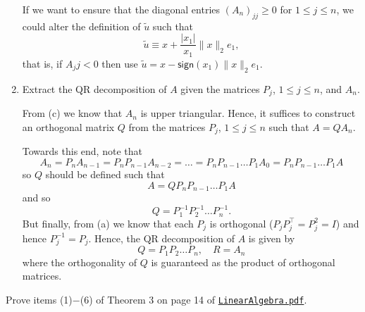 \documentclass{../../../kin_math}
\begin{document}
\begin{questions}
\begin{enumerate}
\begin{solution}
      If we want to ensure that the diagonal entries $(A_n)_{jj} \geq 0$ for $1 \leq j \leq n$, we could alter the definition of $\tilde{u}$ such that
      \begin{equation*}
        \tilde{u} \equiv x + \frac{|x_1|}{x_1} \lVert x \rVert_2 e_1,
      \end{equation*}
      that is, if $A_jj < 0$ then use $\tilde{u}  = x - \textsf{sign}(x_1) \lVert x \rVert_2 e_1$.
    \end{solution}
    \item Extract the QR decomposition of $A$ given the matrices $P_j$, $1 \leq j \leq n$, and $A_n$.
    \begin{solution}
      From (c) we know that $A_n$ is upper triangular. Hence, it suffices to construct an orthogonal matrix $Q$ from the matrices $P_j$, $1 \leq j \leq n$ such that $A = QA_n$.

      Towards this end, note that
      \begin{equation*}
        A_n = P_n A_{n - 1} = P_n P_{n - 1} A_{n - 2} = \dots = P_n P_{n - 1} \dots P_1 A_0 = P_n P_{n - 1} \dots P_1 A
      \end{equation*}
      so $Q$ should be defined such that
      \begin{equation*}
        A = Q P_n P_{n - 1} \dots P_1 A
      \end{equation*}
      and so
      \begin{equation*}
        Q = P_1^{-1} P_2^{-1} \dots P_n^{-1}.
      \end{equation*}
      But finally, from (a) we know that each $P_j$ is orthogonal ($P_jP_j^\top = P_j^2 = I$) and hence $P_j^{-1} = P_j$. Hence, the QR decomposition of $A$ is given by
      \begin{equation*}
        Q = P_1 P_2 \dots P_n, \quad R = A_n
      \end{equation*}
      where the orthogonality of $Q$ is guaranteed as the product of orthogonal matrices.
    \end{solution}
  \end{enumerate}

  \question Prove items (1)$-$(6) of Theorem 3 on page 14 of \texttt{\href{https://www.math.umd.edu/~mariakc/AMSC660/LectureNotes/LinearAlgebra.pdf}{LinearAlgebra.pdf}}.
  \begin{solution}


\end{solution}
\end{questions}
\end{document}
